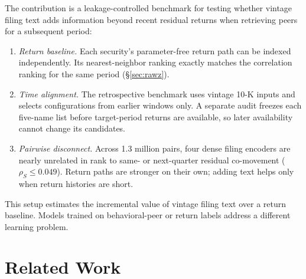 \documentclass[sigconf,anonymous]{acmart}
\begin{document}
The contribution is a leakage-controlled benchmark for testing whether vintage
filing text adds information beyond recent residual returns when retrieving
peers for a subsequent period:
\begin{enumerate}[nosep,leftmargin=*]
  \item \emph{Return baseline.}  Each security's parameter-free return path can
    be indexed independently.  Its nearest-neighbor ranking exactly matches the
    correlation ranking for the same period
    (\S\ref{sec:rawz}).
  \item \emph{Time alignment.}  The retrospective benchmark
    uses vintage 10-K inputs and selects configurations from earlier windows
    only.  A separate audit freezes each five-name list before target-period
    returns are available, so later availability cannot change its candidates.
  \item \emph{Pairwise disconnect.}  Across 1.3 million pairs, four dense filing
    encoders are nearly unrelated in rank to same- or next-quarter residual
    co-movement ($\rho_S\leq0.049$).  Return paths are stronger on their own;
    adding text helps only when return histories are short.
\end{enumerate}

This setup estimates the incremental value of vintage filing text over a return
baseline.  Models trained on behavioral-peer or return labels address a
different learning problem.

\section{Related Work}
\label{sec:related}
\end{document}
